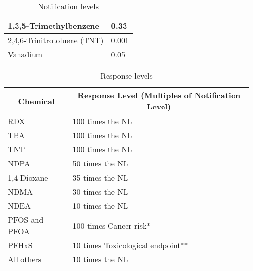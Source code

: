 \begin{table}[]
\begin{center}
\begin{tabular}{|l|l|}
1,3,5-Trimethylbenzene                  & 0.33                                                                      \\ \hline
2,4,6-Trinitrotoluene (TNT)             & 0.001                                                                     \\ \hline
Vanadium                                & 0.05                                                                      \\ \hline
\end{tabular}
\caption{Notification levels} 
\label{table:NotificationLevels}
\end{center}
\end{table}

\newpage
\FloatBarrier

\begin{table}[H]
\begin{center}
\begin{tabular}{|l|l|}
\hline
\multicolumn{1}{|c|}{\textbf{Chemical}} & \multicolumn{1}{c|}{\textbf{Response Level   (Multiples of Notification Level)}} \\ \hline
RDX                                     & 100   times the NL                                                               \\ \hline
TBA                                     & 100   times the NL                                                               \\ \hline
TNT                                     & 100   times the NL                                                               \\ \hline
NDPA                                    & 50   times the NL                                                                \\ \hline
1,4-Dioxane                             & 35   times the NL                                                                \\ \hline
NDMA                                    & 30   times the NL                                                                \\ \hline
NDEA                                    & 10   times the NL                                                                \\ \hline
PFOS and PFOA                           & 100   times Cancer risk*                                                         \\ \hline
PFHxS                                   & 10   times Toxicological endpoint**                                              \\ \hline
All others                              & 10   times the NL                                                                \\ \hline
\end{tabular}
\caption{Response levels} 
\label{table:Responselevels}
\end{center}
\end{table}

